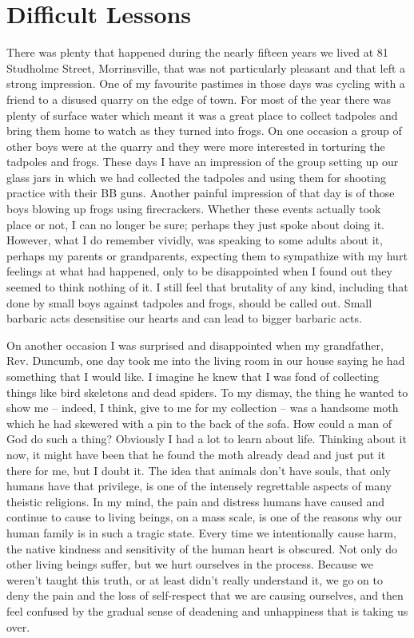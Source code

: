\chapter{Difficult Lessons}

There was plenty that happened during the nearly fifteen years we lived
at 81 Studholme Street, Morrinsville, that was not particularly pleasant
and that left a strong impression. One of my favourite pastimes in those
days was cycling with a friend to a disused quarry on the edge of town.
For most of the year there was plenty of surface water which meant it
was a great place to collect tadpoles and bring them home to watch as
they turned into frogs. On one occasion a group of other boys were at
the quarry and they were more interested in torturing the tadpoles and
frogs. These days I have an impression of the group setting up our glass
jars in which we had collected the tadpoles and using them for shooting
practice with their BB guns. Another painful impression of that day is
of those boys blowing up frogs using firecrackers. Whether these events
actually took place or not, I can no longer be sure; perhaps they just
spoke about doing it. However, what I do remember vividly, was speaking
to some adults about it, perhaps my parents or grandparents, expecting
them to sympathize with my hurt feelings at what had happened, only to
be disappointed when I found out they seemed to think nothing of it. I
still feel that brutality of any kind, including that done by small boys
against tadpoles and frogs, should be called out. Small barbaric acts
desensitise our hearts and can lead to bigger barbaric acts.

On another occasion I was surprised and disappointed when my
grandfather, Rev. Duncumb, one day took me into the living room in our
house saying he had something that I would like. I imagine he knew that
I was fond of collecting things like bird skeletons and dead spiders. To
my dismay, the thing he wanted to show me -- indeed, I think, give to me
for my collection -- was a handsome moth which he had skewered with a
pin to the back of the sofa. How could a man of God do such a thing?
Obviously I had a lot to learn about life. Thinking about it now, it
might have been that he found the moth already dead and just put it
there for me, but I doubt it. The idea that animals don't have souls,
that only humans have that privilege, is one of the intensely
regrettable aspects of many theistic religions. In my mind, the pain and
distress humans have caused and continue to cause to living beings, on a
mass scale, is one of the reasons why our human family is in such a
tragic state. Every time we intentionally cause harm, the native
kindness and sensitivity of the human heart is obscured. Not only do
other living beings suffer, but we hurt ourselves in the process.
Because we weren't taught this truth, or at least didn't really
understand it, we go on to deny the pain and the loss of self-respect
that we are causing ourselves, and then feel confused by the gradual
sense of deadening and unhappiness that is taking us over.

